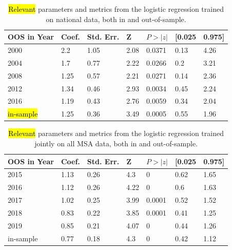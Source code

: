 \documentclass[jrfm,article,accept,oneauthor,pdftex]{Definitions/mdpi}
\begin{document}
\begin{table}[H]
\tabcolsep=0.43cm
  \caption{\hl{Relevant} %
   parameters and metrics from the logistic regression trained on national data, both in and out-of-sample.}
    \begin{tabular}{lllllll}
    \toprule
   \textbf{ OOS in Year} & {\textbf{Coef.}} & {\textbf{Std. Err.}} & {\textbf{Z}} & {\boldmath${P>|z|}$} & {\textbf{[0.025}} & {\textbf{0.975]}} \\
    \midrule
    {2000} & 2.2   & 1.05  & 2.08  & 0.0371 & 0.13  & 4.26 \\
    {2004} & 1.7   & 0.77  & 2.22  & 0.0266 & 0.2   & 3.21 \\
    {2008} & 1.25  & 0.57  & 2.21  & 0.0271 & 0.14  & 2.36 \\
    {2012} & 1.34  & 0.46  & 2.93  & 0.0034 & 0.45  & 2.24 \\
    {2016} & 1.19  & 0.43  & 2.76  & 0.0059 & 0.34  & 2.04 \\
    \hl{in-sample} %
 & 1.25  & 0.36  & 3.49  & 0.0005 & 0.55  & 1.96 \\
    \bottomrule
    \end{tabular}%
  \label{tab:addlabel}%
\end{table}%
\unskip
\begin{table}[H]
\tabcolsep=0.43cm
  \caption{\hl{Relevant} %
 parameters and metrics from the logistic regression trained jointly on all MSA data, both in and out-of-sample.}
    \begin{tabular}{lllllll}
    \toprule
   \textbf{ OOS in Year} & {\textbf{Coef.}} & {\textbf{Std. Err.}} & {\textbf{Z}} & {\boldmath${P>|z|}$} & {\textbf{[0.025}} & {\textbf{0.975]}} \\
    \midrule
    {2015} & 1.13  & 0.26  & 4.3   & 0     & 0.62  & 1.65 \\
    {2016} & 1.12  & 0.26  & 4.22  & 0     & 0.6   & 1.63 \\
    {2017} & 1.02  & 0.25  & 3.99  & 0.0001 & 0.52  & 1.52 \\
    {2018} & 0.83  & 0.22  & 3.85  & 0.0001 & 0.41  & 1.25 \\
    {2019} & 0.85  & 0.21  & 4.07  & 0     & 0.44  & 1.26 \\
    in-sample & 0.77  & 0.18  & 4.3   & 0     & 0.42  & 1.12 \\
    \bottomrule
    \end{tabular}%
  \label{tab:addlabel}%
\end{table}%
\end{document}
